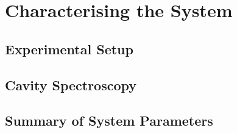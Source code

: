 \documentclass[twoside]{extarticle}
\begin{document}
%
%
%
%
%






\newpage
\section{Characterising the System}
\label{sec:characterizing_the_system}

\subsection{Experimental Setup}
\label{sec:characterizing_the_system:experimental_setup}


\FloatBarrier
\subsection{Cavity Spectroscopy}
\label{sec:characterizing_the_system:cavity_spectroscopy}

\FloatBarrier


\subsection{Summary of System Parameters}
\label{sec:characterizing_the_system:summary_of_experimental_params}






\newpage
\end{document}
